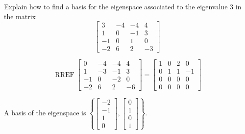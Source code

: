 
\begin{exerciseStatement}


Explain how to find a basis for the eigenspace associated to the eigenvalue \( 3 \) in the matrix \[ \left[\begin{array}{cccc}
3 & -4 & -4 & 4 \\
1 & 0 & -1 & 3 \\
-1 & 0 & 1 & 0 \\
-2 & 6 & 2 & -3
\end{array}\right] \]


\end{exerciseStatement}
    
\begin{exerciseAnswer} 


\[\operatorname{RREF} \left[\begin{array}{cccc}
0 & -4 & -4 & 4 \\
1 & -3 & -1 & 3 \\
-1 & 0 & -2 & 0 \\
-2 & 6 & 2 & -6
\end{array}\right] = \left[\begin{array}{cccc}
1 & 0 & 2 & 0 \\
0 & 1 & 1 & -1 \\
0 & 0 & 0 & 0 \\
0 & 0 & 0 & 0
\end{array}\right] \]



A basis of the eigenspace is \( \left\{ \left[\begin{array}{c}
-2 \\
-1 \\
1 \\
0
\end{array}\right] , \left[\begin{array}{c}
0 \\
1 \\
0 \\
1
\end{array}\right] \right\} \).


\end{exerciseAnswer}
    
